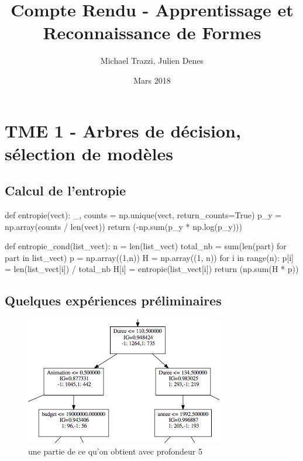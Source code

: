 \documentclass{article}
\title{Compte Rendu - Apprentissage et Reconnaissance de Formes}
\author{Michael Trazzi, Julien Denes }
\date{Mars 2018}
\begin{document}
\maketitle



\section*{TME 1 - Arbres de décision, sélection de modèles}

\subsection*{Calcul de l'entropie}
\begin{python}
  def entropie(vect):
  _, counts = np.unique(vect, return_counts=True)
  p_y = np.array(counts / len(vect))
  return (-np.sum(p_y * np.log(p_y)))
\end{python}

\begin{python}
  def entropie_cond(list_vect):
  n = len(list_vect)
  total_nb = sum(len(part) for part in list_vect)
  p = np.array((1,n))
  H = np.array((1, n))
  for i in range(n):
  p[i] = len(list_vect[i]) / total_nb
  H[i] = entropie(list_vect[i])
  return (np.sum(H * p))
\end{python}

\subsection*{Quelques expériences préliminaires}
\begin{figure}[h]
  \includegraphics[width=\textwidth,
  height=\textheight,keepaspectratio]{tree5_part}
  \caption{une partie de ce qu'on obtient avec profondeur 5}
\end{figure}
\end{document}
